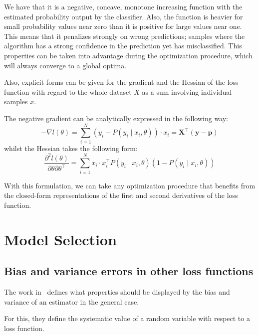\begin{appendices}
We have that it is a negative, concave, monotone increasing function with the estimated probability output by the classifier.
Also, the function is heavier for small probability values near zero than it is positive for large values near one.
This means that it penalizes strongly on wrong predictions; samples where the algorithm has a strong confidence in the prediction yet has misclassified.
This properties can be taken into advantage during the optimization procedure, which will always converge to a global optima.

Also, explicit forms can be given for the gradient and the Hessian of the loss function with regard to the whole dataset $X$ as a sum involving individual samples $x$.

The negative gradient can be analytically expressed in the following way: %
\begin{equation}
- \nabla l(\theta) = \sum_{i=1}^N (y_i - P(y_i \mid x_i,\theta))\cdot x_i = \textbf{X}^{\intercal}(\textbf{y}-\textbf{p})
\label{eq:logitHessian1}
\end{equation}
whilst the Hessian takes the following form:
\begin{equation}
\frac{\partial^2 l(\theta)}{\partial \theta \partial \theta^\intercal} = \sum_{i=1}^N x_i \cdot x_i^\intercal P(y_i \mid x_i,\theta)(1 -P(y_i \mid x_i,\theta))
\label{eq:logitHessian2}
\end{equation}

With this formulation, we can take any optimization procedure that benefits from the closed-form representations of the first and second derivatives of the loss function.



\chapter{Model Selection}

\section{Bias and variance errors in other loss functions}\label{appx:sec:biasVarianceExtensionLoss}

The work in~\cite{james-biasVarianceGeneral} defines what properties should be displayed by the bias and variance of an estimator in the general case.

For this, they define the systematic value of a random variable with respect to a loss function.



\end{appendices}

